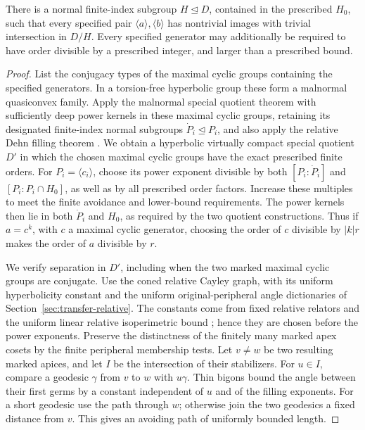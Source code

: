 \begin{lemma}\label{kernel:cyclic-separation}
There is a normal finite-index subgroup \(H\unlhd D\), contained in the
prescribed \(H_0\), such that every specified pair
\(\langle a\rangle,\langle b\rangle\) has nontrivial images with trivial
intersection in \(D/H\).  Every specified generator may additionally
be required to have order divisible by a prescribed integer, and
larger than a prescribed bound.
\end{lemma}

\begin{proof}
List the conjugacy types of the maximal cyclic groups containing the
specified generators.  In a torsion-free hyperbolic group these form
a malnormal quasiconvex family.  Apply the malnormal special quotient
theorem \cite[Corollary~2.8]{AGM2016} with sufficiently deep power
kernels in these maximal cyclic groups, retaining its designated
finite-index normal subgroups $\dot P_i\unlhd P_i$, and also apply the relative
Dehn filling theorem \cite[Theorem~1.1]{Osin2007}.  We obtain a
hyperbolic virtually compact special quotient \(D'\) in which the
chosen maximal cyclic groups have the exact prescribed finite orders.
For $P_i=\langle c_i\rangle$, choose its power exponent divisible by
both $[P_i:\dot P_i]$ and $[P_i:P_i\cap H_0]$, as well as by all
prescribed order factors. Increase these multiples to meet the
finite avoidance and lower-bound requirements. The power kernels
then lie in both $\dot P_i$ and $H_0$, as required by the two
quotient constructions. Thus if \(a=c^k\), with \(c\) a maximal cyclic generator,
choosing the order of \(c\) divisible by \(|k|r\) makes the order of
\(a\) divisible by \(r\).

We verify separation in \(D'\), including when the two marked maximal
cyclic groups are conjugate.  Use the coned relative Cayley graph,
with its uniform hyperbolicity constant and the uniform
original-peripheral angle dictionaries of
Section~\ref{sec:transfer-relative}.  The constants come from fixed relative
relators and the uniform linear relative isoperimetric bound
\cite[Lemmas~2.7 and~5.3]{Osin2007}; hence they are chosen before the
power exponents.  Preserve the distinctness of the finitely many
marked apex cosets by the finite peripheral membership tests.  Let
\(v\ne w\) be two resulting marked apices, and let \(I\) be the
intersection of their stabilizers.  For \(u\in I\), compare a geodesic
\(\gamma\) from \(v\) to \(w\) with \(u\gamma\).  Thin bigons bound the
angle between their first germs by a constant independent of \(u\)
and of the filling exponents.  For a short geodesic use the path
through \(w\); otherwise join the two geodesics a fixed distance from
\(v\).  This gives an avoiding path of uniformly bounded length.


\end{proof}
